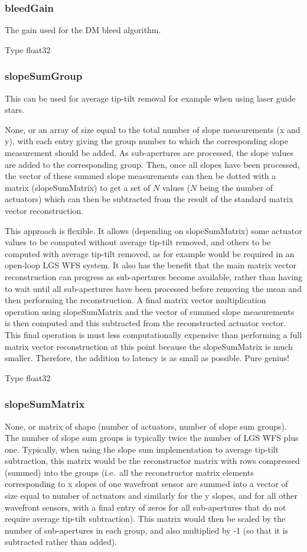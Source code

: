 \documentclass[a4,10pt]{article}
\begin{document}
\subsubsection{bleedGain}
The gain used for the DM bleed algorithm.

Type float32

\subsubsection{slopeSumGroup}
This can be used for average tip-tilt removal for example when using
laser guide stars.

None, or an array of size equal to the total number of slope
measurements (x and y), with each entry giving the group number to
which the corresponding slope measurement should be added.  As
sub-apertures are processed, the slope values are added to the
corresponding group.  Then, once all slopes have been processed, the
vector of these summed slope measurements can then be dotted with a
matrix (slopeSumMatrix) to get a set of $N$ values ($N$ being the
number of actuators) which can then be subtracted from the result of
the standard matrix vector reconstruction.

This approach is flexible.  It allows (depending on slopeSumMatrix)
some actuator values to be computed without average tip-tilt removed,
and others to be computed with average tip-tilt removed, as for
example would be required in an open-loop LGS WFS system.  It also has
the benefit that the main matrix vector reconstruction can progress as
sub-apertures become available, rather than having to wait until all
sub-apertures have been processed before removing the mean and then
performing the reconstruction.  A final matrix vector multiplication
operation using slopeSumMatrix and the vector of summed slope
measurements is then computed and this subtracted from the
reconstructed actuator vector.  This final operation is must less
computationally expensive than performing a full matrix vector
reconstruction at this point because the slopeSumMatrix is much
smaller.  Therefore, the addition to latency is as small as possible.
Pure genius!

Type float32

\subsubsection{slopeSumMatrix}
None, or matrix of shape (number of actuators, number of slope sum
groups).  The number of slope sum groups is typically twice the number
of LGS WFS plus one.  Typically, when using the slope sum
implementation to average tip-tilt subtraction, this matrix would be
the reconstructor matrix with rows compressed (summed) into the groups
(i.e.\ all the reconstructor matrix elements corresponding to x slopes
of one wavefront sensor are summed into a vector of size equal to
number of actuators and similarly for the y slopes, and for all other
wavefront sensors, with a final entry of zeros for all sub-apertures
that do not require average tip-tilt subtraction).  This matrix would
then be scaled by the number of sub-apertures in each group, and also
multiplied by -1 (so that it is subtracted rather than added).
\end{document}
